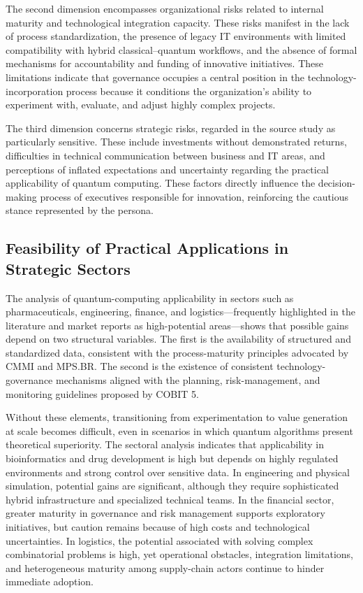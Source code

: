 \documentclass{icis}
\begin{document}
The second dimension encompasses organizational risks related to internal maturity and technological integration capacity. These risks manifest in the lack of process standardization, the presence of legacy IT environments with limited compatibility with hybrid classical--quantum workflows, and the absence of formal mechanisms for accountability and funding of innovative initiatives. These limitations indicate that governance occupies a central position in the technology-incorporation process because it conditions the organization's ability to experiment with, evaluate, and adjust highly complex projects.

The third dimension concerns strategic risks, regarded in the source study as particularly sensitive. These include investments without demonstrated returns, difficulties in technical communication between business and IT areas, and perceptions of inflated expectations and uncertainty regarding the practical applicability of quantum computing. These factors directly influence the decision-making process of executives responsible for innovation, reinforcing the cautious stance represented by the persona.

\subsection{Feasibility of Practical Applications in Strategic Sectors}
The analysis of quantum-computing applicability in sectors such as pharmaceuticals, engineering, finance, and logistics---frequently highlighted in the literature and market reports as high-potential areas---shows that possible gains depend on two structural variables. The first is the availability of structured and standardized data, consistent with the process-maturity principles advocated by CMMI and MPS.BR. The second is the existence of consistent technology-governance mechanisms aligned with the planning, risk-management, and monitoring guidelines proposed by COBIT 5.

Without these elements, transitioning from experimentation to value generation at scale becomes difficult, even in scenarios in which quantum algorithms present theoretical superiority. The sectoral analysis indicates that applicability in bioinformatics and drug development is high but depends on highly regulated environments and strong control over sensitive data. In engineering and physical simulation, potential gains are significant, although they require sophisticated hybrid infrastructure and specialized technical teams. In the financial sector, greater maturity in governance and risk management supports exploratory initiatives, but caution remains because of high costs and technological uncertainties. In logistics, the potential associated with solving complex combinatorial problems is high, yet operational obstacles, integration limitations, and heterogeneous maturity among supply-chain actors continue to hinder immediate adoption.
\end{document}
